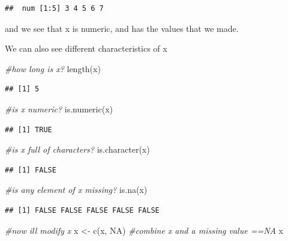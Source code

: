 \documentclass[
]{article}
\newenvironment{Shaded}{\begin{snugshade}}{\end{snugshade}}
\newcommand{\CommentTok}[1]{\textcolor[rgb]{0.56,0.35,0.01}{\textit{#1}}}
\newcommand{\ConstantTok}[1]{\textcolor[rgb]{0.00,0.00,0.00}{#1}}
\newcommand{\FunctionTok}[1]{\textcolor[rgb]{0.00,0.00,0.00}{#1}}
\newcommand{\NormalTok}[1]{#1}
\newcommand{\OtherTok}[1]{\textcolor[rgb]{0.56,0.35,0.01}{#1}}
\begin{document}
\begin{verbatim}
##  num [1:5] 3 4 5 6 7
\end{verbatim}

and we see that x is numeric, and has the values that we made.

We can also see different characteristics of x

\begin{Shaded}
\begin{Highlighting}[]
\CommentTok{\#how long is x?}
\FunctionTok{length}\NormalTok{(x)}
\end{Highlighting}
\end{Shaded}

\begin{verbatim}
## [1] 5
\end{verbatim}

\begin{Shaded}
\begin{Highlighting}[]
\CommentTok{\#is x numeric?}
\FunctionTok{is.numeric}\NormalTok{(x)}
\end{Highlighting}
\end{Shaded}

\begin{verbatim}
## [1] TRUE
\end{verbatim}

\begin{Shaded}
\begin{Highlighting}[]
\CommentTok{\#is x full of characters?}
\FunctionTok{is.character}\NormalTok{(x)}
\end{Highlighting}
\end{Shaded}

\begin{verbatim}
## [1] FALSE
\end{verbatim}

\begin{Shaded}
\begin{Highlighting}[]
\CommentTok{\#is any element of x missing?}
\FunctionTok{is.na}\NormalTok{(x)}
\end{Highlighting}
\end{Shaded}

\begin{verbatim}
## [1] FALSE FALSE FALSE FALSE FALSE
\end{verbatim}

\begin{Shaded}
\begin{Highlighting}[]
\CommentTok{\#now i\textquotesingle{}ll modify x}
\NormalTok{x }\OtherTok{\textless{}{-}} \FunctionTok{c}\NormalTok{(x, }\ConstantTok{NA}\NormalTok{) }\CommentTok{\#combine x and a missing value ==NA}
\NormalTok{x}
\end{Highlighting}
\end{Shaded}
\end{document}
